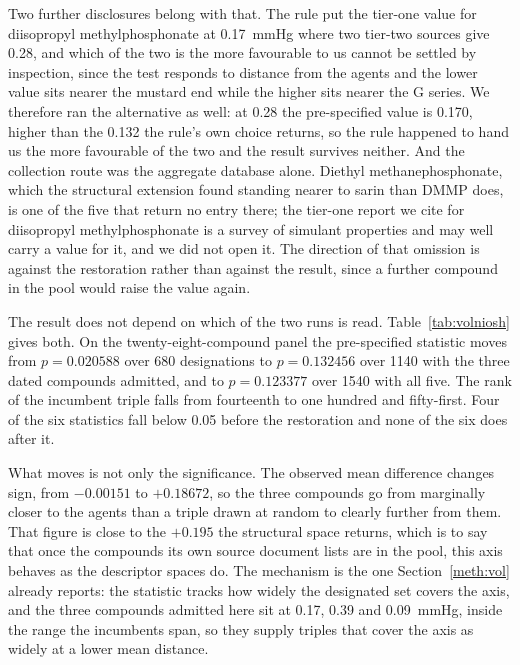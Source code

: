 \documentclass[11pt,a4paper]{article}
\begin{document}
Two further disclosures belong with that. The rule put the tier-one value for
diisopropyl methylphosphonate at 0.17~mmHg where two tier-two sources give
0.28, and which of the two is the more favourable to us cannot be settled by
inspection, since the test responds to distance from the agents and the lower
value sits nearer the mustard end while the higher sits nearer the G series. We
therefore ran the alternative as well: at 0.28 the pre-specified value is
0.170, higher than the 0.132 the rule's own choice returns, so the rule
happened to hand us the more favourable of the two and the result survives
neither. And the collection route was the aggregate database alone. Diethyl
methanephosphonate, which the structural extension found standing nearer to
sarin than DMMP does, is one of the five that return no entry there; the
tier-one report we cite for diisopropyl methylphosphonate is a survey of
simulant properties and may well carry a value for it, and we did not open it.
The direction of that omission is against the restoration rather than against
the result, since a further compound in the pool would raise the value
again.

The result does not depend on which of the two runs is read.
Table~\ref{tab:volniosh} gives both. On the twenty-eight-compound panel the
pre-specified statistic moves from $p = 0.020588$ over 680 designations to
$p = 0.132456$ over 1140 with the three dated compounds admitted, and to
$p = 0.123377$ over 1540 with all five. The rank of the incumbent triple falls
from fourteenth to one hundred and fifty-first. Four of the six statistics fall
below 0.05 before the restoration and none of the six does after it.

What moves is not only the significance. The observed mean difference changes
sign, from $-0.00151$ to $+0.18672$, so the three compounds go from marginally
closer to the agents than a triple drawn at random to clearly further from
them. That figure is close to the $+0.195$ the structural space returns, which
is to say that once the compounds its own source document lists are in the
pool, this axis behaves as the descriptor spaces do. The mechanism is the one
Section~\ref{meth:vol} already reports: the statistic tracks how widely the
designated set covers the axis, and the three compounds admitted here sit at
0.17, 0.39 and 0.09~mmHg, inside the range the incumbents span, so they supply
triples that cover the axis as widely at a lower mean distance.


\end{document}
